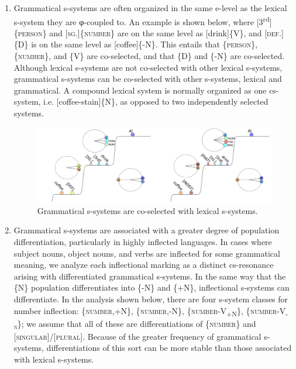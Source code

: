\begin{enumerate}
\item Grammatical s-systems are often organized in the same e-level as the lexical s-system they are φ-coupled to. An example is shown below, where [3\textsuperscript{rd}]\{\textsc{person}\} and [\textsc{sg.}]\{\textsc{number}\} are on the same level as [drink]\{V\}, and [\textsc{def}.]\{D\} is on the same level as [coffee]\{-N\}. This entails that \{\textsc{person}\}, \{\textsc{number}\}, and \{V\} are co-selected, and that \{D\} and \{-N\} are co-selected. Although lexical s-systems are not co-selected with other lexical s-systems, grammatical s-systems can be co-selected with other s-systems, lexical and grammatical. A compound lexical system is normally organized as one cs-system, i.e. [coffee-stain]\{N\}, as opposed to two independently selected systems.

  
\begin{figure}
\includegraphics[width=\textwidth]{figures/Tilsen-img66.png}
\caption{Grammatical s-systems are co-selected with lexical s-systems.}
\label{fig:4:16}
\end{figure}
 

\item  Grammatical s-systems are associated with a greater degree of population differentiation, particularly in highly inflected languages. In cases where subject nouns, object nouns, and verbs are inflected for some grammatical meaning, we analyze each inflectional marking as a distinct cs-resonance arising with differentiated grammatical s-systems. In the same way that the \{N\} population differentiates into \{-N\} and \{+N\}, inflectional s-systems can differentiate. In the analysis shown below, there are four s-system classes for number inflection: \{\textsc{number},+N\}, \{\textsc{number},-N\}, \{\textsc{number}{}-\textsc{V}\textsc{\textsubscript{+N}}\textsc{\}}, \{\textsc{number}{}-\textsc{V}\textsc{\textsubscript{{}-n}}\textsc{\};} we assume that all of these are differentiations of \{\textsc{number}\} and [\textsc{singular}]/[\textsc{plural}]. Because of the greater frequency of grammatical s-systems, differentiations of this sort can be more stable than those associated with lexical s-systems. 


\end{enumerate}
